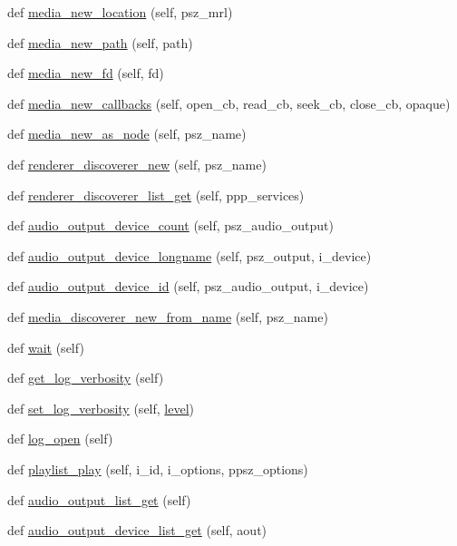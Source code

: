 \begin{DoxyCompactItemize}
\item 
def \hyperlink{classvlc_1_1_instance_a1bcce3da08d8de8c46af611da2bf37fa}{media\+\_\+new\+\_\+location} (self, psz\+\_\+mrl)
\item 
def \hyperlink{classvlc_1_1_instance_aaecf944e5c0044478fbb6cfc8667c974}{media\+\_\+new\+\_\+path} (self, path)
\item 
def \hyperlink{classvlc_1_1_instance_a60fb4f1457712151b617bdb9923e2fb4}{media\+\_\+new\+\_\+fd} (self, fd)
\item 
def \hyperlink{classvlc_1_1_instance_af8c03950a560c8a328a96276bd990d1f}{media\+\_\+new\+\_\+callbacks} (self, open\+\_\+cb, read\+\_\+cb, seek\+\_\+cb, close\+\_\+cb, opaque)
\item 
def \hyperlink{classvlc_1_1_instance_ab99461d314ff3b327e2beca5816ec1ad}{media\+\_\+new\+\_\+as\+\_\+node} (self, psz\+\_\+name)
\item 
def \hyperlink{classvlc_1_1_instance_af5af3418f6e41d878b2d6f080df10ea5}{renderer\+\_\+discoverer\+\_\+new} (self, psz\+\_\+name)
\item 
def \hyperlink{classvlc_1_1_instance_a59e7fce431e7dc8d89fbe9ee7b531340}{renderer\+\_\+discoverer\+\_\+list\+\_\+get} (self, ppp\+\_\+services)
\item 
def \hyperlink{classvlc_1_1_instance_a57716b6319f79d3eaec358210e598d6d}{audio\+\_\+output\+\_\+device\+\_\+count} (self, psz\+\_\+audio\+\_\+output)
\item 
def \hyperlink{classvlc_1_1_instance_adb695b24e932f78c36dcca72806974e9}{audio\+\_\+output\+\_\+device\+\_\+longname} (self, psz\+\_\+output, i\+\_\+device)
\item 
def \hyperlink{classvlc_1_1_instance_a42c03a29126ded661baf367276c59f5e}{audio\+\_\+output\+\_\+device\+\_\+id} (self, psz\+\_\+audio\+\_\+output, i\+\_\+device)
\item 
def \hyperlink{classvlc_1_1_instance_a177b455743be628db069909aa98c83d6}{media\+\_\+discoverer\+\_\+new\+\_\+from\+\_\+name} (self, psz\+\_\+name)
\item 
def \hyperlink{classvlc_1_1_instance_a9c98546f51afac69adc883ec79181283}{wait} (self)
\item 
def \hyperlink{classvlc_1_1_instance_a02e8a90bdd9f1458093c13d1d9d4e903}{get\+\_\+log\+\_\+verbosity} (self)
\item 
def \hyperlink{classvlc_1_1_instance_a037c3684941fe221e207bdc55d10c44d}{set\+\_\+log\+\_\+verbosity} (self, \hyperlink{namespacevlc_afde8e18a788ccc92fc61cab298bca7e3}{level})
\item 
def \hyperlink{classvlc_1_1_instance_a5dd84157243a0595b4be8e4d3d884395}{log\+\_\+open} (self)
\item 
def \hyperlink{classvlc_1_1_instance_a411dd250dfc733b33edb8fb676e51ad4}{playlist\+\_\+play} (self, i\+\_\+id, i\+\_\+options, ppsz\+\_\+options)
\item 
def \hyperlink{classvlc_1_1_instance_a3f066d48b8d8447cc7c5461e69187969}{audio\+\_\+output\+\_\+list\+\_\+get} (self)
\item 
def \hyperlink{classvlc_1_1_instance_ac5b57b31bfaf677dfd90ae3bc2c770e5}{audio\+\_\+output\+\_\+device\+\_\+list\+\_\+get} (self, aout)
\end{DoxyCompactItemize}
